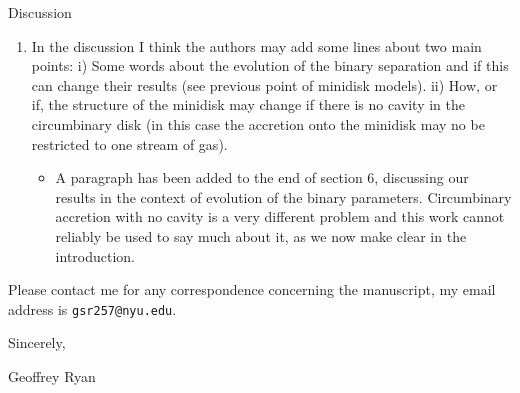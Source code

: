 \documentclass{letter}
\begin{document}
\begin{flushleft}
Discussion
\begin{enumerate}
\item In the discussion I think the authors may add some lines about two main points: i) Some words about the evolution of the binary separation and if this can change their results (see previous point of minidisk models). ii) How, or if, the structure of the minidisk may change if there is no cavity in the circumbinary disk (in this case the accretion onto the minidisk may no be restricted to one stream of gas).
	\begin{itemize}
		\item A paragraph has been added to the end of section 6, discussing our results in the context of evolution of the binary parameters.  Circumbinary accretion with no cavity is a very different problem and this work cannot reliably be used to say much about it, as we now make clear in the introduction.		
	\end{itemize}
\end{enumerate}

  Please contact me for any correspondence concerning the manuscript, my email address is \texttt{gsr257@nyu.edu}.

\vspace{0.5cm}

Sincerely,

Geoffrey Ryan
\end{flushleft}
\end{document}
